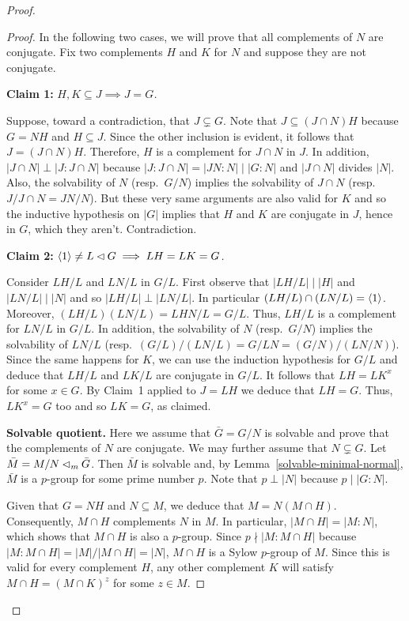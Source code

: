 \begin{proof}
\begin{proof}
    In the following two cases, we will prove that all complements of $N$ are conjugate. Fix two complements $H$ and $K$ for $N$ and suppose they are not conjugate.

    \textbf{Claim 1:} \textit{$H,K\subseteq J\implies J=G$.}

    Suppose, toward a contradiction, that $J\varsubsetneq G$. Note that $J\subseteq(J\cap N)H$ because $G=NH$ and $H\subseteq J$. Since the other inclusion is evident, it follows that $J=(J\cap N)H$. Therefore, $H$ is a complement for $J\cap N$ in $J$. In addition, $|J\cap N|\perp|J:J\cap N|$ because $|J:J\cap N|=|JN:N|\mid|G:N|$ and $|J\cap N|$ divides $|N|$. Also, the solvability of $N$ (resp.~$G/N$) implies the solvability of $J\cap N$ (resp.~$J/J\cap N=JN/N$). But these very same arguments are also valid for $K$ and so the inductive hypothesis on $|G|$ implies that $H$ and $K$ are conjugate in $J$, hence in $G$, which they aren't. Contradiction.

    \textbf{Claim 2:} \textit{$\langle1\rangle\ne L\lhd G\implies LH=LK=G$.}

    Consider $LH/L$ and $LN/L$ in $G/L$. First observe that $|LH/L|\mid|H|$ and $|LN/L|\mid|N|$ and so $|LH/L|\perp|LN/L|$. In particular $(LH/L)\cap(LN/L)=\langle1\rangle$. Moreover, $(LH/L)(LN/L)=LHN/L=G/L$. Thus, $LH/L$ is a complement for $LN/L$ in $G/L$. In addition, the solvability of $N$ (resp.~$G/N$) implies the solvability of $LN/L$ (resp.~$(G/L)/(LN/L)=G/LN=(G/N)/(LN/N)$). Since the same happens for $K$, we can use the induction hypothesis for $G/L$ and deduce that $LH/L$ and $LK/L$ are conjugate in $G/L$. It follows that $LH=LK^x$ for some $x\in G$. By Claim~1 applied to $J=LH$ we deduce that $LH=G$. Thus, $LK^x=G$ too and so $LK=G$, as claimed.

    \medskip

    \textbf{Solvable quotient.} Here we assume that $\bar G=G/N$ is solvable and prove that the complements of $N$ are conjugate. We may further assume that $N\varsubsetneq G$. Let $\bar M=M/N\lhd_m\bar G$. Then $\bar M$ is solvable and, by Lemma~\ref{solvable-minimal-normal}, $\bar M$ is a $p$-group for some prime number $p$. Note that $p\perp|N|$ because $p\mid |G:N|$.

    Given that $G=NH$ and $N\subseteq M$, we deduce that $M=N(M\cap H)$. Consequently, $M\cap H$ complements $N$ in $M$. In particular, $|M\cap H|=|M:N|$, which shows that $M\cap H$ is also a $p$-group. Since\/ $p\nmid|M:M\cap H|$ because\/ $|M:M\cap H|=|M|/|M\cap H|=|N|$, $M\cap H$ is a Sylow\/ $p$-group of\/ $M$. Since this is valid for every complement $H$, any other complement $K$ will satisfy $M\cap H=(M\cap K)^z$ for some $z\in M$.
    

\end{proof}
\end{proof}
